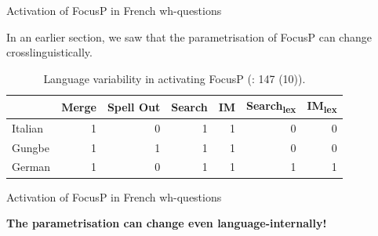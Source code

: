 \documentclass[lesson_slides]{subfiles}
\begin{document}
\begin{frame}[c]{Activation of FocusP in French wh-questions}

    In an earlier section, we saw that the parametrisation of FocusP can change crosslinguistically. \pause

    \begin{table}[H]
    \centering
        \begin{tabular}{|l|r|r|r|r|r|r|}
        \hline
         & Merge & Spell Out & Search & IM & Search\textsubscript{lex} & IM\textsubscript{lex} \\
        \hline
        Italian & 1 & 0 & 1 & 1 & 0 & 0 \\
        \hline
        Gungbe & 1 & 1 & 1 & 1 & 0 & 0 \\
        \hline
        German & 1 & 0 & 1 & 1 & 1 & 1 \\
        \hline
        \end{tabular}
    \caption{\label{tab:samp}Language variability in activating FocusP (\citealt{samo2019cartography}: 147 (10)).}
    \end{table}

\end{frame}
\begin{frame}[c]{Activation of FocusP in French wh-questions}

\begin{center}
    \bf{The parametrisation can change even language-internally!}
\end{center}

\end{frame}
\end{document}
